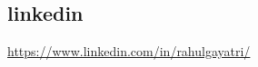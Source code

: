 \documentclass[margin]{res}
\begin{document}
\begin{resume}
        \section{linkedin} \url{https://www.linkedin.com/in/rahulgayatri/}
\end{resume}
%
\end{document}
